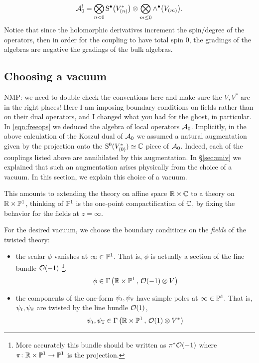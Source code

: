 \documentclass[11pt]{amsart}
\def\natalie#1{{\textcolor{green!65!black}{NMP: {#1}}}}
\begin{document}
\begin{equation}
\mathcal{A}_0^{!} = \bigotimes_{n < 0} {\rm S}^\bullet \big(V^*_{(n)}\big) \otimes \bigotimes_{m \leq 0} \wedge^\bullet \big(V_{(m)}\big).
\end{equation} Notice that since the holomorphic derivatives increment the spin/degree of the operators, then in order for the coupling to have total spin 0, the gradings of the algebras are negative the gradings of the bulk algebras.


\subsection{Choosing a vacuum} 
\natalie{we need to double check the conventions here and make sure the $V, V^*$ are in the right places! Here I am imposing boundary conditions on fields rather than on their dual operators, and I changed what you had for the ghost, in particular.}
In \eqref{eqn:freeops} we deduced the algebra of local operators $\mathcal A_0$. 
Implicitly, in the above calculation of the Koszul dual of $\mathcal A_0$ we assumed a natural augmentation given by the projection onto the ${\rm S}^0(V^*_{(0)})\simeq \mathbb C$ piece of $\mathcal A_0$. 
Indeed, each of the couplings listed above are annihilated by this augmentation. 
In \S \ref{sec:univ} we explained that such an augmentation arises physically from the choice of a vacuum. 
In this section, we explain this choice of a vacuum. 

This amounts to extending the theory on affine space $\mathbb R \times \mathbb C$ to a theory on $\mathbb R \times \mathbb P^1$, thinking of $\mathbb P^1$ is the one-point compactification of $\mathbb C$, by fixing the behavior for the fields at $z = \infty$. 

For the desired vacuum, we choose the boundary conditions on the \textit{fields} of the twisted theory:
\begin{itemize}
\item the scalar $\phi$ vanishes at $\infty \in \mathbb P^1$. 
That is, $\phi$ is actually a section of the line bundle $\mathcal O(-1)$ \footnote{More accurately this bundle should be written as $\pi^* \mathcal O(-1)$ where $\pi \colon \mathbb R \times \mathbb P^1 \to \mathbb P^1$ is the projection.}, 
\[
\phi \in \Gamma \left(\mathbb R \times \mathbb P^1 \, , \, \mathcal O(-1) \otimes V \right) 
\]
\item the components of the one-form $\psi_{t}, \psi_{{\overline{z}}}$ have simple poles at $\infty \in \mathbb P^1$.
That is, $\psi_t,\psi_{{\overline{z}}}$ are twisted by the line bundle $\mathcal O(1)$,
\[
\psi_{t}, \psi_{{\overline{z}}}\in \Gamma\left(\mathbb R \times \mathbb P^1 \, , \, \mathcal O(1) \otimes V^*\right)
\]
\end{itemize}
\end{document}
